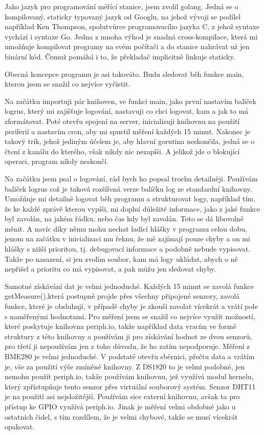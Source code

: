 Jako jazyk pro programování měřící stanice, jsem zvolil golang. Jedná se o kompilovaný, staticky typovaný jazyk od 
Googlu,  na jehož vývoji se podílel například Ken Thompson, spolutvůrce programovacího jazyka C, z jehož syntaxe vychází 
i syntaxe Go. Jedna z mnoha výhod je snadná cross-kompilace, která mi umožňuje kompilovat programy na svém počítači a do 
stanice nahrávat už jen binární kód. Čemuž pomáhá i to, že překladač implicitně linkuje staticky.

Obecná koncepce programu je asi takováto. Budu sledovat běh funkce main, kterou jsem se snažil co nejvíce vyčistit.

Na začátku importuji pár knihoven, ve funkci main, jako první nastavím balíček logrus, který mi zajišťuje logování, 
nastavuji co chci logovat, kam a jak to má zformátovat. Poté otevřu spojení na server, inicializuji knihovnu na použití 
periferií a nastavím cron, aby mi spustil měření každých 15 minut. Nakonec je takový trik, jehož jediným účelem je, aby 
hlavní gorutina neskončila, jedná se o čtení z kanálu do kterého, však nikdy nic nezapíši. A jelikož jde o blokující 
operaci, program nikdy neskončí.

Na začátku jsem psal o logování, rád bych ho popsal trochu detailněji. Používám balíček logrus což je taková rozšířená 
verze balíčku log ze standardní knihovny. Umožňuje mi detailně logovat běh programu a strukturovat logy, například tím, 
že ke každé zprávě kterou vypíši, mi doplní důležité informace, jako z jaké funkce byl zavolán, na jakém řádku, nebo čas 
kdy byl zavolán. Toto se dá libovolně měnit. A navíc díky němu mohu nechat ladící hlášky v programu celou dobu, jenom na 
začátku v inicializaci mu řeknu, že mě zajímají pouze chyby a on mi hlášky s nižší prioritou, tj. debugovací informace 
a podobně nebude vypisovat. Takže po nasazení, si jen zvolím soubor, kam má logy ukládat, abych o ně nepřišel a prioritu 
co má vypisovat, a pak můžu jen sledovat chyby.

Samotné získávání dat je velmi jednoduché. Každých 15 minut se zavolá funkce getMeasure(),která postupně projde přes 
všechny připojené senzory, zavolá funkce, které je obsluhují, v případě chyby je zkouší zavolat vícekrát a vrátí pole 
s naměřenými hodnotami. Pro měření jsem se snažil co nejvíce využít možností, které poskytuje knihovna periph.io, takže 
například data vracím ve formě struktury z této knihovny a používám ji pro získávání hodnot ze dvou senzorů, pro třetí 
ji nepoužívám jen z toho důvodu, že ho zatím nepodporuje. Měření z BME280 je velmi jednoduché. V podstatě otevřu 
sběrnici, přečtu data a vrátím je, vše za použití výše zmíněné knihovny. Z DS1820 to je velmi podobné, jen nemohu použít 
periph.io, takže používám knihovnu, jež využívá modul kernelu, který zpřístupňuje tento senzor přes virtuální souborový 
systém. Senzor DHT11 je na použití asi nejsložitější. Používám sice externí knihovnu, avšak ta pro přístup ke GPIO 
využívá periph.io. Jinak je měření velmi obdobné jako u ostatních čidel, s tím rozdílem, že je velmi chybové, takže se 
musí vícekrát opakovat.
